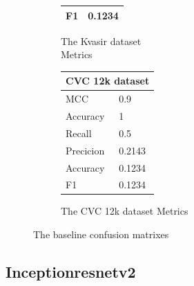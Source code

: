 \begin{figure}[h]
\begin{subfigure}[b]{0.49\textwidth}
\begin{tabular}{ll}
        F1                                     & 0.1234\\
        \bottomrule
\end{tabular}
\caption{The Kvasir dataset\\ Metrics}
\label{tab:kvasir_metrics_base}
\end{subfigure}%
\begin{subfigure}[b]{0.25\textwidth}
        \begin{tabular}{ll}
        \toprule
        \multicolumn{2}{c}{CVC 12k dataset}        \\
        \midrule
        MCC & 0.9    \\
        Accuracy                         & 1      \\
        Recall                              & 0.5    \\
        Precicion                        & 0.2143 \\
        Accuracy                        & 0.1234 \\
        F1                                     & 0.1234\\
        \bottomrule
        \end{tabular}
\caption{The CVC 12k dataset Metrics}
\label{tab:cvc12k_metrics_base}
\end{subfigure}
\caption{The baseline confusion matrixes}
\label{fig:BaselineCM}
\end{figure}

\FloatBarrier


\subsection{Inceptionresnetv2}


